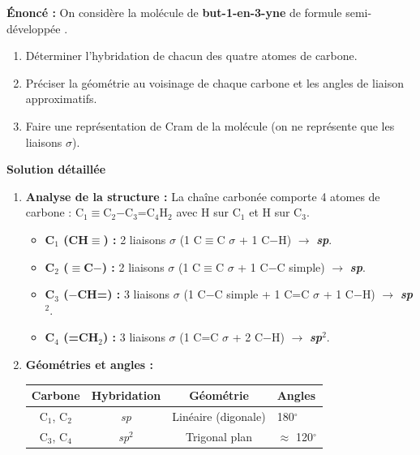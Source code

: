 \documentclass[11pt]{article}
\begin{document}
\begin{exoresolu}[Géométrie du but-1-en-3-yne (CH$\equiv$C$-$CH=CH$_2$)]
\textbf{Énoncé :} On considère la molécule de \textbf{but-1-en-3-yne} de formule semi-développée .
\begin{enumerate}
    \item Déterminer l'hybridation de chacun des quatre atomes de carbone.
    \item Préciser la géométrie au voisinage de chaque carbone et les angles de liaison approximatifs.
    \item Faire une représentation de Cram de la molécule (on ne représente que les liaisons $\sigma$).
\end{enumerate}

\tcblower
\textbf{Solution détaillée}

\begin{enumerate}
    \item \textbf{Analyse de la structure :} La chaîne carbonée comporte 4 atomes de carbone : C$_1$$\equiv$C$_2$$-$C$_3$=C$_4$H$_2$ avec H sur C$_1$ et H sur C$_3$.
    \begin{itemize}
        \item \textbf{C$_1$ (CH$\equiv$) :} 2 liaisons $\sigma$ (1 C$\equiv$C $\sigma$ + 1 C$-$H) $\rightarrow$ \textbf{\textit{sp}}.
        \item \textbf{C$_2$ ($\equiv$C$-$) :} 2 liaisons $\sigma$ (1 C$\equiv$C $\sigma$ + 1 C$-$C simple) $\rightarrow$ \textbf{\textit{sp}}.
        \item \textbf{C$_3$ ($-$CH=) :} 3 liaisons $\sigma$ (1 C$-$C simple + 1 C=C $\sigma$ + 1 C$-$H) $\rightarrow$ \textbf{\textit{sp}$^2$}.
        \item \textbf{C$_4$ (=CH$_2$) :} 3 liaisons $\sigma$ (1 C=C $\sigma$ + 2 C$-$H) $\rightarrow$ \textbf{\textit{sp}$^2$}.
    \end{itemize}

    \item \textbf{Géométries et angles :}
    \begin{center}
    \begin{tabularx}{\linewidth}{|c|c|c|X|}
    \hline
    \rowcolor{popblueL}
    \textbf{Carbone} & \textbf{Hybridation} & \textbf{Géométrie} & \textbf{Angles} \\ \hline
    C$_1$, C$_2$ & \textit{sp} & Linéaire (digonale) & 180$^\circ$ \\ \hline
    C$_3$, C$_4$ & \textit{sp}$^2$ & Trigonal plan & $\approx$ 120$^\circ$ \\ \hline
    \end{tabularx}
    \end{center}


\end{enumerate}
\end{exoresolu}
\end{document}
